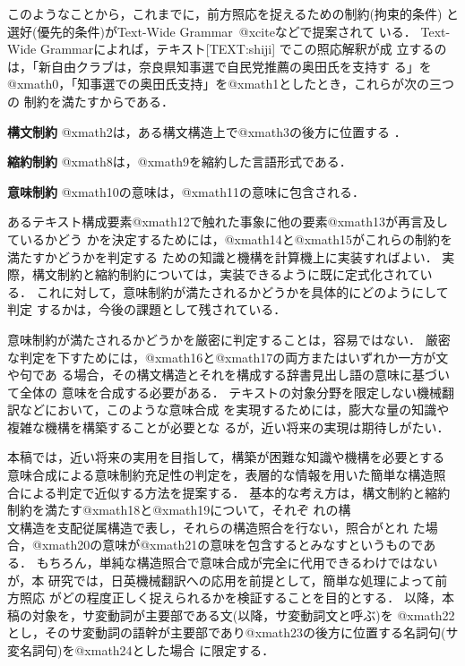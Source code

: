 このようなことから，これまでに，前方照応を捉えるための制約(拘束的条件)
と選好(優先的条件)がText-Wide Grammar~@xciteなどで提案されて
いる．
Text-Wide Grammarによれば，テキスト[TEXT:shiji] でこの照応解釈が成
立するのは，「新自由クラブは，奈良県知事選で自民党推薦の奥田氏を支持す
る」を@xmath0，「知事選での奥田氏支持」を@xmath1としたとき，これらが次の三つの
制約を満たすからである．
\smallskip
\begin{LIST}
\item[\bf 構文制約] @xmath2は，ある構文構造上で@xmath3の後方に位置する
．
\item[\bf 縮約制約] @xmath8は，@xmath9を縮約した言語形式である．
\item[\bf 意味制約] @xmath10の意味は，@xmath11の意味に包含される．
\end{LIST}
\smallskip
あるテキスト構成要素@xmath12で触れた事象に他の要素@xmath13が再言及しているかどう
かを決定するためには，@xmath14と@xmath15がこれらの制約を満たすかどうかを判定する
ための知識と機構を計算機上に実装すればよい．
実際，構文制約と縮約制約については，実装できるように既に定式化されてい
る．
これに対して，意味制約が満たされるかどうかを具体的にどのようにして判定
するかは，今後の課題として残されている．

意味制約が満たされるかどうかを厳密に判定することは，容易ではない．
厳密な判定を下すためには，@xmath16と@xmath17の両方またはいずれか一方が文や句であ
る場合，その構文構造とそれを構成する辞書見出し語の意味に基づいて全体の
意味を合成する必要がある．
テキストの対象分野を限定しない機械翻訳などにおいて，このような意味合成
を実現するためには，膨大な量の知識や複雑な機構を構築することが必要とな
るが，近い将来の実現は期待しがたい． 

本稿では，近い将来の実用を目指して，構築が困難な知識や機構を必要とする
意味合成による意味制約充足性の判定を，表層的な情報を用いた簡単な構造照
合による判定で近似する方法を提案する．
基本的な考え方は，構文制約と縮約制約を満たす@xmath18と@xmath19について，それぞ
れの構\\文構造を支配従属構造で表し，それらの構造照合を行ない，照合がとれ
た場合，@xmath20の意味が@xmath21の意味を包含するとみなすというものである．
もちろん，単純な構造照合で意味合成が完全に代用できるわけではないが，本
研究では，日英機械翻訳への応用を前提として，簡単な処理によって前方照応
がどの程度正しく捉えられるかを検証することを目的とする．
以降，本稿の対象を，サ変動詞が主要部である文(以降，サ変動詞文と呼ぶ)を
@xmath22とし，そのサ変動詞の語幹が主要部であり@xmath23の後方に位置する名詞句(サ
変名詞句)を@xmath24とした場合
に限定する．

